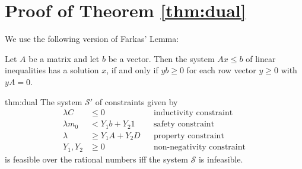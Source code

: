 \section{Proof of Theorem \ref{thm:dual}}

We use the following version of Farkas' Lemma:

\begin{theorem}
\label{lem:farkas}
Let $A$ be a matrix and let $b$ be a vector.
Then the system $Ax \le b$ of linear inequalities has a solution $x$,
if and only if $yb \ge 0$ for each row vector $y \ge 0$ with $yA = 0$.
\end{theorem}

\begin{reftheorem}{thm:dual}
The system $\mathcal{S}'$ of constraints given by
\begin{align*}
  \lambda C    & \le 0            && \text{inductivity constraint} \\
  \lambda m_0  & <   Y_1 b + Y_2 1 && \text{safety constraint} \\
  \lambda      & \ge Y_1 A + Y_2 D && \text{property constraint} \\
  Y_1, Y_2     & \ge 0     && \text{non-negativity constraint} 
\end{align*}
is feasible over the rational numbers if{}f the system $\mathcal{S}$ is infeasible.
\end{reftheorem}
